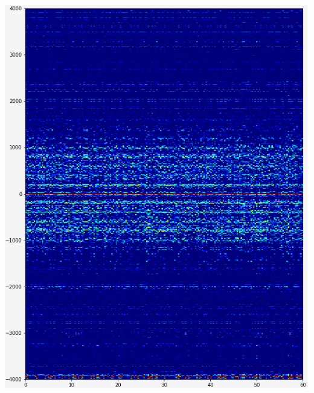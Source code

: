 \documentclass[a0,portrait]{a0poster}
\begin{document}
\begin{multicols}{2}
\begin{tcolorbox}[colback=blue!5!white,colframe=blue!75!black,title,title={\section*{Résultats}}]
\begin{minipage}{0.2\textwidth}
    \includegraphics[width=1.0\textwidth]{./iter=80000.png}
\end{minipage}%
\begin{minipage}{0.2\textwidth}

\end{minipage}
\end{tcolorbox}
\end{multicols}
\end{document}
